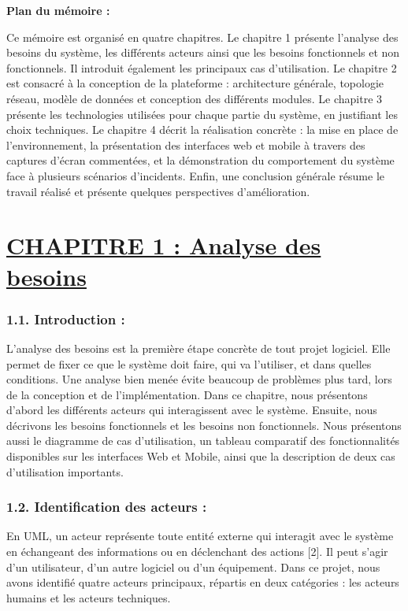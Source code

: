 \documentclass[12pt,a4paper]{report}
\newcommand{\ub}[1]{\uline{\textbf{#1}}}
\begin{document}
\textbf{Plan du mémoire :}\par
Ce mémoire est organisé en quatre chapitres. Le chapitre 1 présente l’analyse des besoins du système, les différents acteurs ainsi que les besoins fonctionnels et non fonctionnels. Il introduit également les principaux cas d’utilisation. Le chapitre 2 est consacré à la conception de la plateforme : architecture générale, topologie réseau, modèle de données et conception des différents modules. Le chapitre 3 présente les technologies utilisées pour chaque partie du système, en justifiant les choix techniques. Le chapitre 4 décrit la réalisation concrète : la mise en place de l'environnement, la présentation des interfaces web et mobile à travers des captures d'écran commentées, et la démonstration du comportement du système face à plusieurs scénarios d'incidents. Enfin, une conclusion générale résume le travail réalisé et présente quelques perspectives d’amélioration.\par
\clearpage
\chapter*{\ub{CHAPITRE 1 : Analyse des besoins}}
\subsection*{1.1. Introduction :}
L'analyse des besoins est la première étape concrète de tout projet logiciel. Elle permet de fixer ce que le système doit faire, qui va l'utiliser, et dans quelles conditions. Une analyse bien menée évite beaucoup de problèmes plus tard, lors de la conception et de l'implémentation. Dans ce chapitre, nous présentons d’abord les différents acteurs qui interagissent avec le système. Ensuite, nous décrivons les besoins fonctionnels et les besoins non fonctionnels. Nous présentons aussi le diagramme de cas d’utilisation, un tableau comparatif des fonctionnalités disponibles sur les interfaces Web et Mobile, ainsi que la description de deux cas d’utilisation importants.\par
\subsection*{1.2. Identification des acteurs :}
En UML, un acteur représente toute entité externe qui interagit avec le système en échangeant des informations ou en déclenchant des actions [2]. Il peut s’agir d’un utilisateur, d’un autre logiciel ou d’un équipement. Dans ce projet, nous avons identifié quatre acteurs principaux, répartis en deux catégories : les acteurs humains et les acteurs techniques.\par
\end{document}
